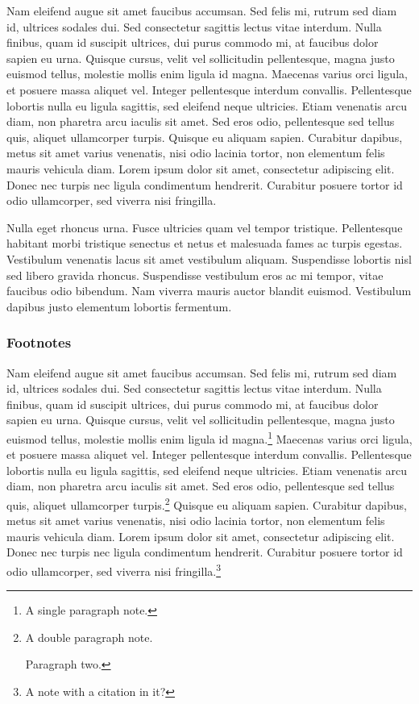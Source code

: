 \documentclass{article}
\begin{document}
Nam eleifend augue sit amet faucibus accumsan. Sed felis mi, rutrum sed diam id, ultrices sodales dui. Sed consectetur sagittis lectus vitae interdum. Nulla finibus, quam id suscipit ultrices, dui purus commodo mi, at faucibus dolor sapien eu urna. Quisque cursus, velit vel sollicitudin pellentesque, magna justo euismod tellus, molestie mollis enim ligula id magna.\autocite{https://doi.org/10.15463/rec.799967328} Maecenas varius orci ligula, et posuere massa aliquet vel. Integer pellentesque interdum convallis. Pellentesque lobortis nulla eu ligula sagittis, sed eleifend neque ultricies. Etiam venenatis arcu diam, non pharetra arcu iaculis sit amet.\autocite{Williams_2020} Sed eros odio, pellentesque sed tellus quis, aliquet ullamcorper turpis. Quisque eu aliquam sapien. Curabitur dapibus, metus sit amet varius venenatis, nisi odio lacinia tortor, non elementum felis mauris vehicula diam. Lorem ipsum dolor sit amet, consectetur adipiscing elit. Donec nec turpis nec ligula condimentum hendrerit. Curabitur posuere tortor id odio ullamcorper, sed viverra nisi fringilla.\autocite{https://doi.org/10.15463/rec.612893388}


Nulla eget rhoncus urna. Fusce ultricies quam vel tempor tristique. Pellentesque habitant morbi tristique senectus et netus et malesuada fames ac turpis egestas. Vestibulum venenatis lacus sit amet vestibulum aliquam. Suspendisse lobortis nisl sed libero gravida rhoncus. Suspendisse vestibulum eros ac mi tempor, vitae faucibus odio bibendum. Nam viverra mauris auctor blandit euismod. Vestibulum dapibus justo elementum lobortis fermentum.


\subsubsection{Footnotes}\label{H7237703}



Nam eleifend augue sit amet faucibus accumsan. Sed felis mi, rutrum sed diam id, ultrices sodales dui. Sed consectetur sagittis lectus vitae interdum. Nulla finibus, quam id suscipit ultrices, dui purus commodo mi, at faucibus dolor sapien eu urna. Quisque cursus, velit vel sollicitudin pellentesque, magna justo euismod tellus, molestie mollis enim ligula id magna.\footnote{A single paragraph note.} Maecenas varius orci ligula, et posuere massa aliquet vel. Integer pellentesque interdum convallis. Pellentesque lobortis nulla eu ligula sagittis, sed eleifend neque ultricies. Etiam venenatis arcu diam, non pharetra arcu iaculis sit amet. Sed eros odio, pellentesque sed tellus quis, aliquet ullamcorper turpis.\footnote{A double paragraph note.


Paragraph two.} Quisque eu aliquam sapien. Curabitur dapibus, metus sit amet varius venenatis, nisi odio lacinia tortor, non elementum felis mauris vehicula diam. Lorem ipsum dolor sit amet, consectetur adipiscing elit. Donec nec turpis nec ligula condimentum hendrerit. Curabitur posuere tortor id odio ullamcorper, sed viverra nisi fringilla.\footnote{A note with a citation in it?\autocite{https://doi.org/10.15463/rec.612893388}}
\end{document}

